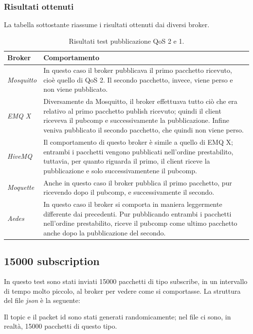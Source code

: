 \documentclass[binding=0.6cm,TFA]{sapthesis}
\begin{document}
\begin{large}
\newpage
\subsubsection{Risultati ottenuti}
La tabella sottostante riassume i risultati ottenuti dai diversi broker.
\begin{table}[h]
\caption{Risultati test pubblicazione QoS 2 e 1.}
\label{tab:resultsqos2and1}
\begin{tabular}{lp{}}
\toprule
\textbf{Broker} & \textbf{Comportamento} \\
\midrule
\textit{Mosquitto} & In questo caso il broker pubblicava il primo pacchetto ricevuto, cioè quello di QoS 2. Il secondo pacchetto, invece, viene perso e non viene pubblicato. \\
\textit{EMQ X} & Diversamente da Mosquitto, il broker effettuava tutto ciò che era relativo al primo pacchetto publish ricevuto; quindi il client riceveva il pubcomp e successivamente la pubblicazione. Infine veniva pubblicato il secondo pacchetto, che quindi non viene perso. \\
\textit{HiveMQ} & Il comportamento di questo broker è simile a quello di EMQ X; entrambi i pacchetti vengono pubblicati nell'ordine prestabilito, tuttavia, per quanto riguarda il primo, il client riceve la pubblicazione e solo successivamentene il pubcomp. \\
\textit{Moquette} & Anche in questo caso il broker pubblica il primo pacchetto, pur ricevendo dopo il pubcomp, e successivamente il secondo.\\
\textit{Aedes} & In questo caso il broker si comporta in maniera leggermente differente dai precedenti. Pur pubblicando entrambi i pacchetti nell'ordine prestabilito, riceve il pubcomp come ultimo pacchetto anche dopo la pubblicazione del secondo. \\
\bottomrule
\end{tabular}
\end{table}

\subsection{15000 subscription}
In questo test sono stati inviati 15000 pacchetti di tipo subscribe, in un intervallo di tempo molto piccolo, al broker per vedere come si comportasse. La struttura del file \textit{json} è la seguente:

\begin{python}
\end{python}
Il topic e il packet id sono stati generati randomicamente; nel file ci sono, in realtà, 15000 pacchetti di questo tipo. \\


\end{large}
\end{document}
